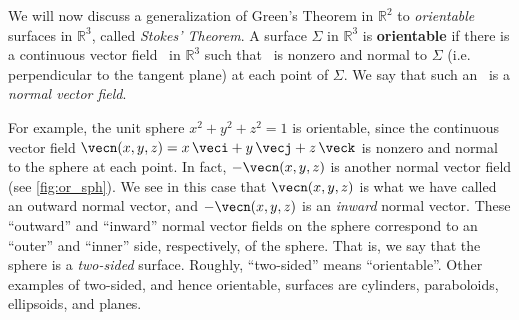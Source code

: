 
We will now discuss a generalization of Green's Theorem in $\mathbb{R}^{2}$ to \emph{orientable} surfaces in $\mathbb{R}^{3}$, called \emph{Stokes' Theorem}. A surface $\Sigma$ in $\mathbb{R}^{3}$ is \textbf{orientable} if there is a continuous vector field \vecn\ in $\mathbb{R}^{3}$ such that \vecn\ is nonzero and normal to $\Sigma$ (i.e. perpendicular to the tangent plane) at each point of $\Sigma$. We say that such an \vecn\ is a \emph{normal vector field}.


For example, the unit sphere $x^2 + y^2 + z^2 = 1$ is orientable, since the continuous vector field $\vecn(x,y,z) = x\,\veci + y\,\vecj + z\,\veck$ is nonzero and normal to the sphere at each point. In fact, $-\vecn(x,y,z)$ is another normal vector field (see \autoref{fig:or_sph}). We see in this case that $\vecn(x,y,z)$ is what we have called an outward normal vector, and $-\vecn(x,y,z)$ is an \emph{inward} normal vector. These ``outward'' and ``inward'' normal vector fields on the sphere correspond to an ``outer'' and ``inner'' side, respectively, of the sphere. That is, we say that the sphere is a \emph{two-sided} surface. Roughly, ``two-sided'' means ``orientable''. Other examples of two-sided, and hence orientable, surfaces are cylinders, paraboloids, ellipsoids, and planes.

